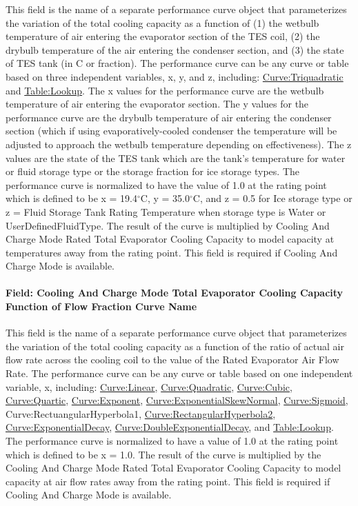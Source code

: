 This field is the name of a separate performance curve object that parameterizes the variation of the total cooling capacity as a function of (1) the wetbulb temperature of air entering the evaporator section of the TES coil, (2) the drybulb temperature of the air entering the condenser section, and (3) the state of TES tank (in C or fraction). The performance curve can be any curve or table based on three independent variables, x, y, and z, including: \hyperref[curvetriquadratic]{Curve:Triquadratic} and \hyperref[tablelookup]{Table:Lookup}. The x values for the performance curve are the wetbulb temperature of air entering the evaporator section. The y values for the performance curve are the drybulb temperature of air entering the condenser section (which if using evaporatively-cooled condenser the temperature will be adjusted to approach the wetbulb temperature depending on effectiveness). The z values are the state of the TES tank which are the tank's temperature for water or fluid storage type or the storage fraction for ice storage types. The performance curve is normalized to have the value of 1.0 at the rating point which is defined to be x = 19.4$^\circ$C, y = 35.0$^\circ$C, and z = 0.5 for Ice storage type or z = Fluid Storage Tank Rating Temperature when storage type is Water or UserDefinedFluidType. The result of the curve is multiplied by Cooling And Charge Mode Rated Total Evaporator Cooling Capacity to model capacity at temperatures away from the rating point. This field is required if Cooling And Charge Mode is available.

\paragraph{Field: Cooling And Charge Mode Total Evaporator Cooling Capacity Function of Flow Fraction Curve Name}\label{field-cooling-and-charge-mode-total-evaporator-cooling-capacity-function-of-flow-fraction-curve-name}

This field is the name of a separate performance curve object that parameterizes the variation of the total cooling capacity as a function of the ratio of actual air flow rate across the cooling coil to the value of the Rated Evaporator Air Flow Rate. The performance curve can be any curve or table based on one independent variable, x, including: \hyperref[curvelinear]{Curve:Linear}, \hyperref[curvequadratic]{Curve:Quadratic}, \hyperref[curvecubic]{Curve:Cubic}, \hyperref[curvequartic]{Curve:Quartic}, \hyperref[curveexponent]{Curve:Exponent}, \hyperref[curveexponentialskewnormal]{Curve:ExponentialSkewNormal}, \hyperref[curvesigmoid]{Curve:Sigmoid}, Curve:RectuangularHyperbola1, \hyperref[curverectangularhyperbola2]{Curve:RectangularHyperbola2}, \hyperref[curveexponentialdecay]{Curve:ExponentialDecay}, \hyperref[curvedoubleexponentialdecay]{Curve:DoubleExponentialDecay}, and \hyperref[tablelookup]{Table:Lookup}. The performance curve is normalized to have a value of 1.0 at the rating point which is defined to be x = 1.0. The result of the curve is multiplied by the Cooling And Charge Mode Rated Total Evaporator Cooling Capacity to model capacity at air flow rates away from the rating point. This field is required if Cooling And Charge Mode is available.

